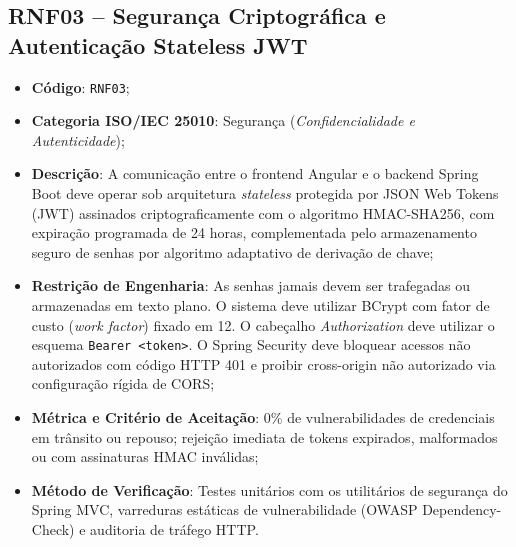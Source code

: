 \subsection{RNF03 -- Segurança Criptográfica e Autenticação Stateless JWT}
\begin{itemize}
    \item \textbf{Código}: \texttt{RNF03};
    \item \textbf{Categoria ISO/IEC 25010}: Segurança (\textit{Confidencialidade e Autenticidade});
    \item \textbf{Descrição}: A comunicação entre o frontend Angular e o backend Spring Boot deve operar sob arquitetura \textit{stateless} protegida por JSON Web Tokens (JWT) assinados criptograficamente com o algoritmo HMAC-SHA256, com expiração programada de 24 horas, complementada pelo armazenamento seguro de senhas por algoritmo adaptativo de derivação de chave;
    \item \textbf{Restrição de Engenharia}: As senhas jamais devem ser trafegadas ou armazenadas em texto plano. O sistema deve utilizar BCrypt com fator de custo (\textit{work factor}) fixado em 12. O cabeçalho \textit{Authorization} deve utilizar o esquema \texttt{Bearer <token>}. O Spring Security deve bloquear acessos não autorizados com código HTTP 401 e proibir cross-origin não autorizado via configuração rígida de CORS;
    \item \textbf{Métrica e Critério de Aceitação}: 0\% de vulnerabilidades de credenciais em trânsito ou repouso; rejeição imediata de tokens expirados, malformados ou com assinaturas HMAC inválidas;
    \item \textbf{Método de Verificação}: Testes unitários com os utilitários de segurança do Spring MVC, varreduras estáticas de vulnerabilidade (OWASP Dependency-Check) e auditoria de tráfego HTTP.
\end{itemize}

